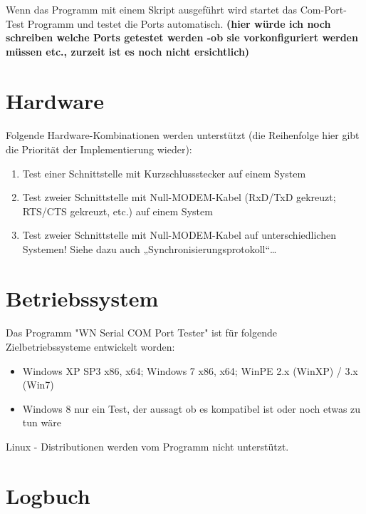 Wenn das Programm mit einem Skript ausgeführt wird startet das Com-Port-Test Programm und testet die Ports automatisch. \textbf{(hier würde ich  noch schreiben welche Ports getestet werden -ob sie vorkonfiguriert werden müssen etc., zurzeit ist es noch nicht ersichtlich)}


\section{Hardware}
\paragraph{}
Folgende Hardware-Kombinationen werden unterstützt (die Reihenfolge hier gibt die Priorität der Implementierung wieder):
\begin{enumerate}
\item Test einer Schnittstelle mit Kurzschlussstecker auf einem System
\item Test zweier Schnittstelle mit Null-MODEM-Kabel (RxD/TxD gekreuzt; RTS/CTS gekreuzt, etc.) auf einem System
\item Test zweier Schnittstelle mit Null-MODEM-Kabel auf unterschiedlichen Systemen! Siehe dazu auch „Synchronisierungsprotokoll“…
\end{enumerate}



\section{Betriebssystem}
\paragraph{}
Das Programm "WN Serial COM Port Tester" ist für folgende Zielbetriebssysteme entwickelt worden:
\begin{itemize}
\item Windows XP SP3 x86, x64; Windows 7 x86, x64; WinPE 2.x (WinXP) / 3.x (Win7)
\item Windows 8 nur ein Test, der aussagt ob es kompatibel ist oder noch etwas zu tun wäre
\end{itemize}
Linux - Distributionen werden vom Programm nicht unterstützt.

\section{Logbuch}
